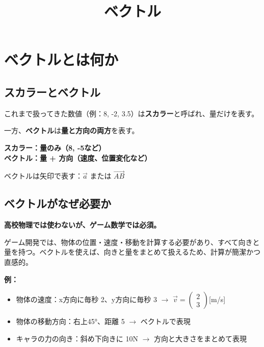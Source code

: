 \documentclass[paper=a4,fleqn]{jlreq}
\title{ベクトル}
\author{}
\date{}
\makeatletter
\renewcommand{\maketitle}{%
  \begin{center}
    {\large\bfseries \@title\par}
  \end{center}
  \vspace{4pt}
}
\makeatother
\begin{document}
\maketitle

\section{ベクトルとは何か}

\subsection{スカラーとベクトル}

これまで扱ってきた数値（例：8, -2, 3.5）は\textbf{スカラー}と呼ばれ、量だけを表す。

一方、\textbf{ベクトル}は\textbf{量と方向の両方}を表す。

\begin{center}
{\large\bfseries
  スカラー：量のみ（8, -5など）\\[4pt]
  ベクトル：量 + 方向（速度、位置変化など）
}
\end{center}

ベクトルは矢印で表す：\(\vec{a}\) または \(\overrightarrow{AB}\)

\subsection{ベクトルがなぜ必要か}

\textbf{高校物理では使わないが、ゲーム数学では必須。}

ゲーム開発では、物体の位置・速度・移動を計算する必要があり、すべて向きと量を持つ。ベクトルを使えば、向きと量をまとめて扱えるため、計算が簡潔かつ直感的。

\textbf{例：}
\begin{itemize}
  \item 物体の速度：x方向に毎秒 2、y方向に毎秒 3 \(\rightarrow\) \(\vec{v} = \begin{pmatrix} 2 \\ 3 \end{pmatrix}\)[m/s]
  \item 物体の移動方向：右上45°、距離 5 \(\rightarrow\) ベクトルで表現
  \item キャラの力の向き：斜め下向きに 10N \(\rightarrow\) 方向と大きさをまとめて表現
\end{itemize}
\end{document}
